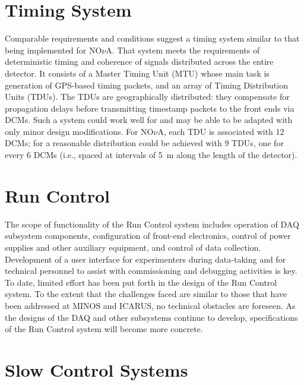 \section{Timing System }
\label{sec:v5-trig-timing}

Comparable requirements and conditions suggest a timing system 
similar to that being implemented for NO$\nu$A.  That system meets the 
requirements of deterministic timing and coherence of signals distributed 
across the entire detector.   It consists of a Master Timing Unit (MTU)
whose main task is generation of GPS-based timing packets, and an 
array of Timing Distribution Units (TDUs).  The TDUs are geographically 
distributed: they compensate for propagation delays before transmitting 
timestamp packets to the front ends via DCMs.  Such a system could work 
well for \LBNE and may be able to be adapted with only minor 
design modifications.  For NO$\nu$A, each TDU is associated with 12 DCMs; 
for \LBNE a reasonable distribution could be achieved with 9 TDUs, 
one for every 6 DCMs (i.e., spaced at intervals of 5~m along the 
length of the detector).

\section{Run Control }
\label{sec:v5-trig-runcontrol}

The scope of 
functionality of the Run Control system includes operation of DAQ 
subsystem components, configuration 
of front-end electronics, control of power supplies and other auxiliary 
equipment, and control of data collection.  Development of a 
user interface for experimenters during data-taking and for technical 
personnel to assist with commissioning and debugging activities is key.  To date, 
limited effort has been put forth in the design of the Run Control system.
To the extent that the challenges faced are similar to those that have 
been addressed at MINOS and ICARUS, no technical obstacles are foreseen.  
As the designs of the DAQ and other subsystems continue to develop, 
specifications of the Run Control system will become more concrete.

\section{Slow Control Systems }
\label{sec:v5-trig-slowcontrol}

